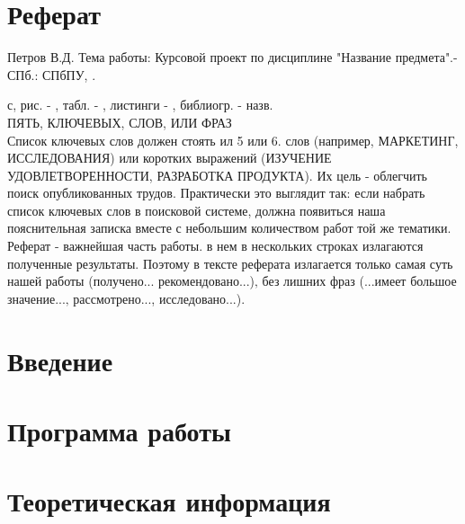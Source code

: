 




\section*{\centering Реферат}

Петров В.Д. Тема работы: Курсовой проект по дисциплине "Название предмета".- СПб.: СПбПУ, \the\year. \begin{NoHyper}{\pageref{LastPage}}\end{NoHyper}  с, рис. - \totalfigures{}, табл. - \totaltables{}, листинги - , библиогр. -  назв.\\[1cm]

ПЯТЬ, КЛЮЧЕВЫХ, СЛОВ, ИЛИ ФРАЗ\\

Список ключевых слов должен стоять ил 5 или 6. слов (например, МАРКЕТИНГ, ИССЛЕДОВАНИЯ) или коротких выражений (ИЗУЧЕНИЕ УДОВЛЕТВОРЕННОСТИ, РАЗРАБОТКА ПРОДУКТА). Их цель - облегчить поиск опубликованных трудов. Практически это выглядит так: если набрать список ключевых слов в поисковой системе, должна появиться наша пояснительная записка вместе с небольшим количеством работ той же тематики.\\

Реферат - важнейшая часть работы. в нем в нескольких строках излагаются полученные результаты. Поэтому в тексте реферата излагается только самая суть нашей работы (получено... рекомендовано...)‚ без лишних фраз (...имеет большое значение...‚ рассмотрено..., исследовано...).


\thispagestyle{empty} %
\newpage



\renewcommand\contentsname{\centerline{Содержание}}
\tableofcontents
\newpage



\section*{Введение}


\section{Программа работы}


\section{Теоретическая информация}


